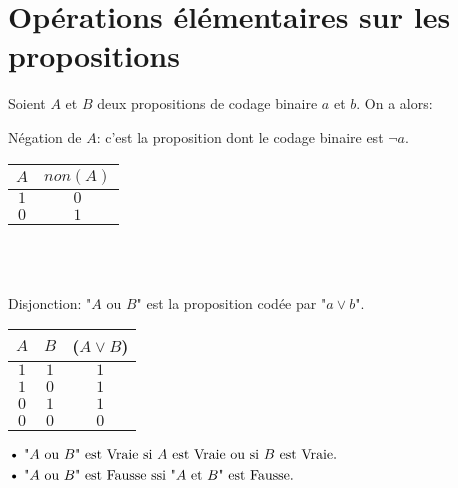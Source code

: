 \documentclass[12pt,twoside,a4paper]{article}
\begin{document}
	\section{Op\'erations \'el\'ementaires sur les propositions}
		Soient $A$ et $B$ deux propositions de codage binaire $a$ et $b$. On a  alors:
		\begin{liste}
			\item N\'egation de $A$: c'est la proposition dont le codage binaire est $\neg a$.\\
				\begin{tabular}{ c | c }
					$A$ & $non(A)$\\\hline 
					$1$&$0$\\
					$0$&$1$\\
				\end{tabular}\\\\
			\item Disjonction: "$A$ ou $B$" est la proposition cod\'ee par "$a\vee b$".\\
				\begin{tabular}{ c | c | c  }
					$A$ & $B$ &($A\vee B$)\\\hline 
					$1$&$1$&$1$\\
					$1$&$0$&$1$\\
					$0$&$1$&$1$\\
					$0$&$0$&$0$\\
				\end{tabular} 
				$\begin{aligned}
					&\text{\textbullet}\ \text{"}A\text{ ou }B\text{" est Vraie si }A\text{ est Vraie ou si }B\text{ est Vraie.}\\
					&\text{\textbullet}\ \text{"}A\text{ ou }B\text{" est Fausse ssi "}A\text{ et }B\text{" est Fausse.}
				\end{aligned}$
		\end{liste}
\end{document}
